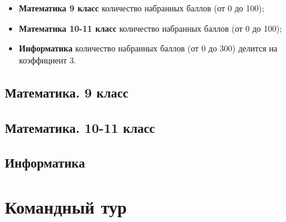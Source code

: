 \documentclass[a4paper,12pt,oneside]{book}
\begin{document}
\begin{itemize}
    \item {\bf Математика 9 класс} количество набранных баллов
    (от 0 до 100);
    \item {\bf Математика 10-11 класс} количество набранных баллов
    (от 0 до 100);
    \item {\bf Информатика} количество набранных баллов (от 0 до
    300) делится на коэффициент 3.
\end{itemize}


\section{Математика. 9 класс}


\section{Математика. 10-11 класс}


\section{Информатика}


\chapter{Командный тур}





\clearpage
\text{ }
\end{document}
